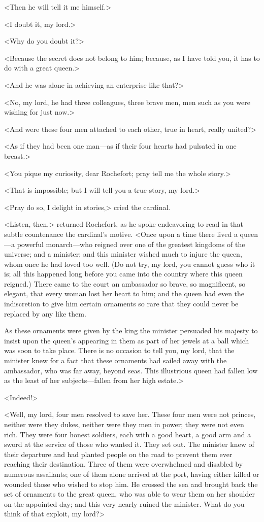 <Then he will tell it me himself.>

<I doubt it, my lord.>

<Why do you doubt it?>

<Because the secret does not belong to him; because, as I have told you, it has to do with a great queen.>

<And he was alone in achieving an enterprise like that?>

<No, my lord, he had three colleagues, three brave men, men such as you were wishing for just now.>

<And were these four men attached to each other, true in heart, really united?>

<As if they had been one man—as if their four hearts had pulsated in one breast.>

<You pique my curiosity, dear Rochefort; pray tell me the whole story.>

<That is impossible; but I will tell you a true story, my lord.>

<Pray do so, I delight in stories,> cried the cardinal.

<Listen, then,> returned Rochefort, as he spoke endeavoring to read in that subtle countenance the cardinal's motive. <Once upon a time there lived a queen—a powerful monarch—who reigned over one of the greatest kingdoms of the universe; and a minister; and this minister wished much to injure the queen, whom once he had loved too well. (Do not try, my lord, you cannot guess who it is; all this happened long before you came into the country where this queen reigned.) There came to the court an ambassador so brave, so magnificent, so elegant, that every woman lost her heart to him; and the queen had even the indiscretion to give him certain ornaments so rare that they could never be replaced by any like them.

As these ornaments were given by the king the minister persuaded his majesty to insist upon the queen's appearing in them as part of her jewels at a ball which was soon to take place. There is no occasion to tell you, my lord, that the minister knew for a fact that these ornaments had sailed away with the ambassador, who was far away, beyond seas. This illustrious queen had fallen low as the least of her subjects—fallen from her high estate.>

<Indeed!>

<Well, my lord, four men resolved to save her. These four men were not princes, neither were they dukes, neither were they men in power; they were not even rich. They were four honest soldiers, each with a good heart, a good arm and a sword at the service of those who wanted it. They set out. The minister knew of their departure and had planted people on the road to prevent them ever reaching their destination. Three of them were overwhelmed and disabled by numerous assailants; one of them alone arrived at the port, having either killed or wounded those who wished to stop him. He crossed the sea and brought back the set of ornaments to the great queen, who was able to wear them on her shoulder on the appointed day; and this very nearly ruined the minister. What do you think of that exploit, my lord?>

